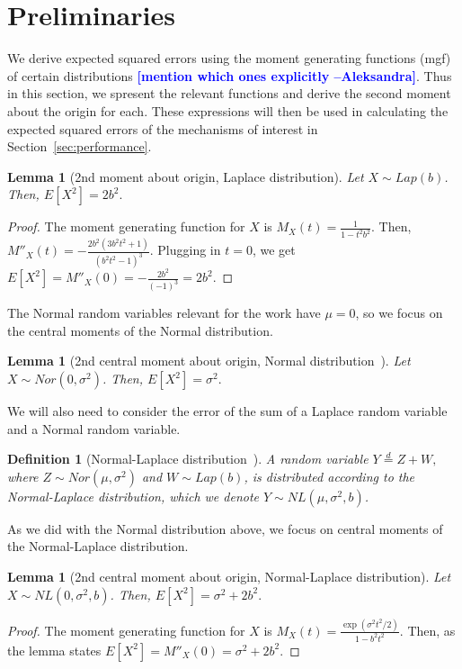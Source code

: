 \documentclass{article}
\newcommand{\ak}[1]{\textcolor{blue}{\bf\small [#1 --Aleksandra]}}
\theoremstyle{plain}
\newtheorem{lem}[thm]{Lemma}
\newtheorem{defn}[thm]{Definition}
\begin{document}
\section{Preliminaries}
We derive expected squared errors using the moment generating functions (mgf) of certain distributions \ak{mention which ones explicitly}. Thus in this section, we spresent the relevant functions and derive the second moment about the origin for each. These expressions will then be used in calculating the expected squared errors of the mechanisms of interest in Section~\ref{sec:performance}. 

\begin{lem}[2nd moment about origin, Laplace distribution]
Let $X \sim Lap(b)$. Then, $E[X^2] = 2b^2.$
\end{lem}
\begin{proof}
The moment generating function for $X$ is $M_X(t) = \frac{1}{1 - t^2b^2}.$
Then, $M''_X(t) = -\frac{2b^2(3b^2t^2 + 1)}{(b^2t^2 - 1)^3}.$
Plugging in $t = 0$, we get 
$E[X^2] = M''_X(0) = -\frac{2b^2}{(-1)^3} = 2b^2.$
\end{proof}

The Normal random variables relevant for the work have $\mu = 0$, so we focus on the central moments of the Normal distribution.

\begin{lem}[2nd central moment about origin, Normal distribution~\cite{papoulis2002probability}]
Let $X \sim Nor(0, \sigma^2)$. Then,
$E[X^2] = \sigma^2.$
\end{lem}

We will also need to consider the error of the sum of a Laplace random variable and a Normal random variable. %
\begin{defn}[Normal-Laplace distribution~\cite{Reed2006}]
A random variable $Y \overset{d}{=} Z + W,$ where $Z \sim Nor(\mu, \sigma^2)$ and $W \sim Lap(b)$, is distributed according to the Normal-Laplace distribution, which we denote $Y \sim NL(\mu, \sigma^2, b)$.
\end{defn}

As we did with the Normal distribution above, we focus on central moments of the Normal-Laplace distribution.
\begin{lem}[2nd central moment about origin, Normal-Laplace distribution]
\label{nl_secmom}
Let $X \sim NL(0, \sigma^2, b)$. Then, 
$E[X^2] = \sigma^2 + 2b^2.$
\end{lem}
\begin{proof}
The moment generating function for $X$ is
$M_X(t) = \frac{\exp(\sigma^2t^2/2)}{1 - b^2t^2}.$
Then, as the lemma states
$E[X^2] = M''_X(0) = \sigma^2 + 2b^2.$
\end{proof}
\end{document}
